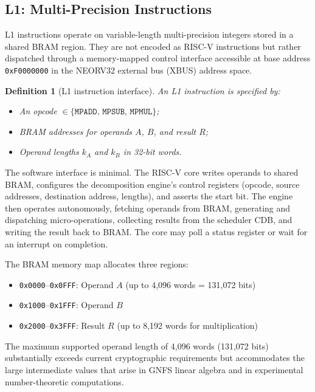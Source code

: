 \documentclass[11pt,a4paper]{article}
\newtheorem{definition}{Definition}
\begin{document}
\subsection{L1: Multi-Precision Instructions}
\label{sec:l1}

L1 instructions operate on variable-length multi-precision integers stored
in a shared BRAM region.  They are not encoded as RISC-V instructions but
rather dispatched through a memory-mapped control interface accessible at
base address \texttt{0xF0000000} in the NEORV32 external bus (XBUS) address
space.

\begin{definition}[L1 instruction interface]
An L1 instruction is specified by:
\begin{itemize}[leftmargin=*]
  \item An opcode $\in \{\mathtt{MPADD},\, \mathtt{MPSUB},\, \mathtt{MPMUL}\}$;
  \item BRAM addresses for operands $A$, $B$, and result $R$;
  \item Operand lengths $k_A$ and $k_B$ in 32-bit words.
\end{itemize}
\end{definition}

The software interface is minimal.  The RISC-V core writes operands to
shared BRAM, configures the decomposition engine's control registers
(opcode, source addresses, destination address, lengths), and asserts the
start bit.  The engine then operates autonomously, fetching operands from
BRAM, generating and dispatching micro-operations, collecting results from
the scheduler CDB, and writing the result back to BRAM.  The core may poll
a status register or wait for an interrupt on completion.

The BRAM memory map allocates three regions:
\begin{itemize}[leftmargin=*]
  \item \texttt{0x0000}--\texttt{0x0FFF}: Operand $A$ (up to 4,096 words = 131,072 bits)
  \item \texttt{0x1000}--\texttt{0x1FFF}: Operand $B$
  \item \texttt{0x2000}--\texttt{0x3FFF}: Result $R$ (up to 8,192 words for multiplication)
\end{itemize}

The maximum supported operand length of 4,096 words (131,072 bits)
substantially exceeds current cryptographic requirements but accommodates
the large intermediate values that arise in GNFS linear algebra and in
experimental number-theoretic computations.
\end{document}
